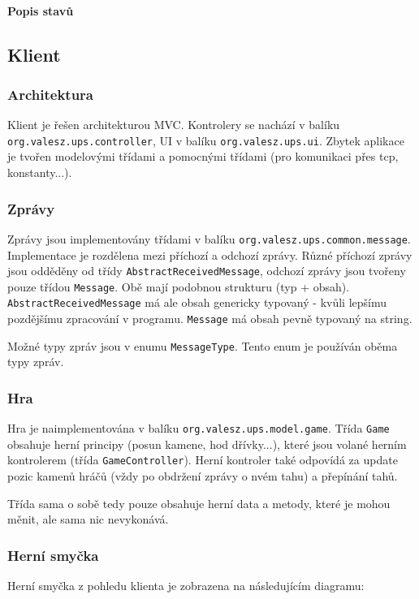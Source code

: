 \documentclass[11pt,a4paper]{scrartcl}
\begin{document}
	\paragraph{Popis stavů}
	
	\subsection{Klient}
	\subsubsection{Architektura}
	Klient je řešen architekturou MVC. Kontrolery se nachází v balíku \verb|org.valesz.ups.controller|, UI v balíku \verb|org.valesz.ups.ui|. Zbytek aplikace je tvořen modelovými třídami a pomocnými třídami (pro komunikaci přes tcp, konstanty...).
	
	\subsubsection{Zprávy}
	Zprávy jsou implementovány třídami v balíku \verb|org.valesz.ups.common.message|. Implementace je rozdělena mezi příchozí a odchozí zprávy. Různé příchozí zprávy jsou odděděny od třídy \verb|AbstractReceivedMessage|, odchozí zprávy jsou tvořeny pouze třídou \verb|Message|. Obě mají podobnou strukturu (typ + obsah). \verb|AbstractReceivedMessage| má ale obsah genericky typovaný - kvůli lepšímu pozdějšímu zpracování v programu. \verb|Message| má obsah pevně typovaný na string.
	
	Možné typy zpráv jsou v enumu \verb|MessageType|. Tento enum je používán oběma typy zpráv.
	
	\subsubsection{Hra}
	Hra je naimplementována v balíku \verb|org.valesz.ups.model.game|. Třída \verb|Game| obsahuje herní principy (posun kamene, hod dřívky...), které jsou volané herním kontrolerem (třída \verb|GameController|). Herní kontroler také odpovídá za update pozic kamenů hráčů (vždy po obdržení zprávy o nvém tahu) a přepínání tahů.
	
	Třída sama o sobě tedy pouze obsahuje herní data a metody, které je mohou měnit, ale sama nic nevykonává.
	
		
	\subsubsection{Herní smyčka}
	Herní smyčka z pohledu klienta je zobrazena na následujícím diagramu:
	
\end{document}

